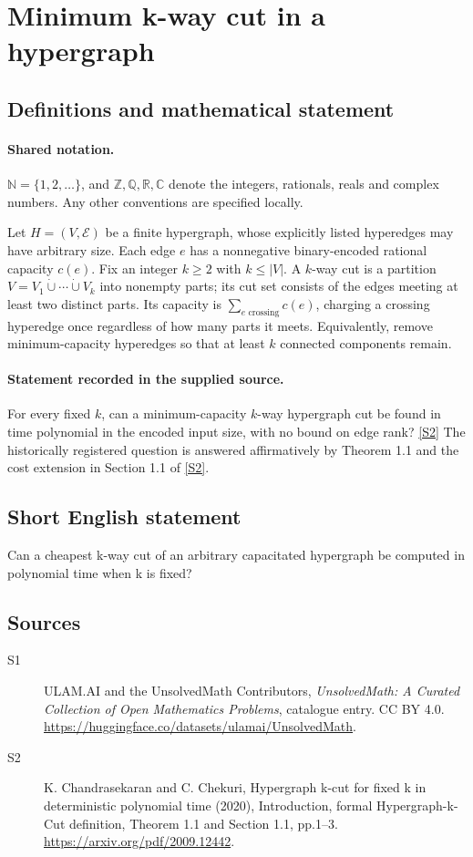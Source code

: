 \documentclass[11pt]{article}
\newcommand{\sref}[2]{\hyperlink{source:#1:#2}{[S#2]}}
\begin{document}
\section{Minimum k-way cut in a hypergraph}\label{statement}

\subsection{Definitions and mathematical statement}

\paragraph{Shared notation.}$\mathbb N=\{1,2,\ldots\}$, and $\mathbb Z,\mathbb Q,\mathbb R,\mathbb C$ denote the integers, rationals, reals and complex numbers. Any other conventions are specified locally.


Let $H=(V,\mathcal E)$ be a finite hypergraph, whose explicitly listed hyperedges may have arbitrary size. Each edge $e$ has a nonnegative binary-encoded rational capacity $c(e)$. Fix an integer $k\ge2$ with $k\le|V|$. A $k$-way cut is a partition $V=V_1\dot\cup\cdots\dot\cup V_k$ into nonempty parts; its cut set consists of the edges meeting at least two distinct parts. Its capacity is $\sum_{e\text{ crossing}}c(e)$, charging a crossing hyperedge once regardless of how many parts it meets. Equivalently, remove minimum-capacity hyperedges so that at least $k$ connected components remain.
\paragraph{Statement recorded in the supplied source.}
For every fixed $k$, can a minimum-capacity $k$-way hypergraph cut be found in time polynomial in the encoded input size, with no bound on edge rank? \sref{statement}{2}
The historically registered question is answered affirmatively by Theorem 1.1 and the cost extension in Section 1.1 of \sref{statement}{2}.
\subsection{Short English statement}
Can a cheapest k-way cut of an arbitrary capacitated hypergraph be computed in polynomial time when k is fixed?
\subsection{Sources}
\begin{description}
\item[\hypertarget{source:statement:1}{S1}] ULAM.AI and the UnsolvedMath Contributors, \emph{UnsolvedMath: A Curated Collection of Open Mathematics Problems}, catalogue entry. CC BY 4.0. \url{https://huggingface.co/datasets/ulamai/UnsolvedMath}.
\item[\hypertarget{source:statement:2}{S2}] K. Chandrasekaran and C. Chekuri, Hypergraph k-cut for fixed k in deterministic polynomial time (2020), Introduction, formal Hypergraph-k-Cut definition, Theorem 1.1 and Section 1.1, pp.1--3. \url{https://arxiv.org/pdf/2009.12442}.
\end{description}
\label{end:statement}
\end{document}
